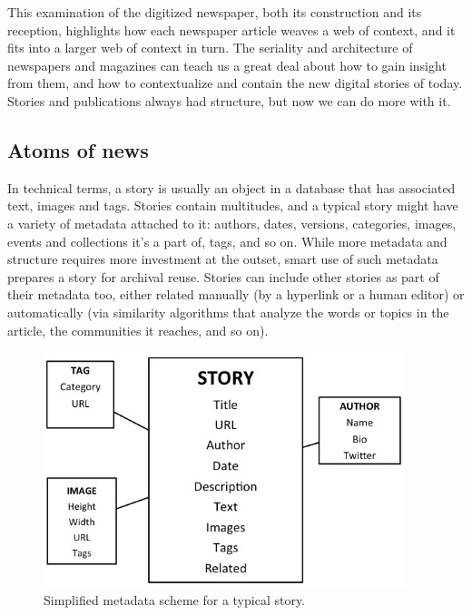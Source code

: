 This examination of the digitized newspaper, both its construction and its reception, highlights how each newspaper article weaves a web of context, and it fits into a larger web of context in turn. The seriality and architecture of newspapers and magazines can teach us a great deal about how to gain insight from them, and how to contextualize and contain the new digital stories of today. Stories and publications always had structure, but now we can do more with it.

\subsection{Atoms of news}

In technical terms, a story is usually an object in a database that has associated text, images and tags. Stories contain multitudes, and a typical story might have a variety of metadata attached to it: authors, dates, versions, categories, images, events and collections it's a part of, tags, and so on. While more metadata and structure requires more investment at the outset, smart use of such metadata prepares a story for archival reuse. Stories can include other stories as part of their metadata too, either related manually (by a hyperlink or a human editor) or automatically (via similarity algorithms that analyze the words or topics in the article, the communities it reaches, and so on).

\begin{figure}[ht]
\centering
\includegraphics[width=300pt]{figures/storyschema}
\caption{Simplified metadata scheme for a typical story.}
\label{fig:storyschema}
\end{figure}


